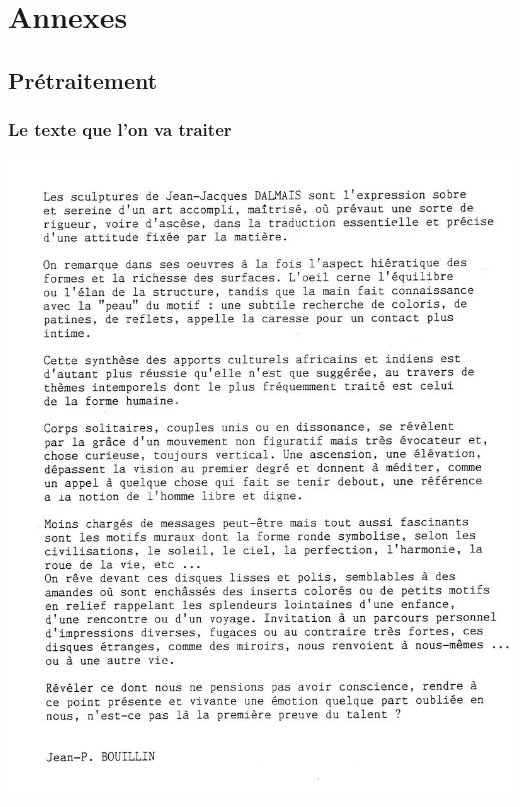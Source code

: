 \documentclass[a4paper,12pt]{report}
\begin{document}








\appendix

\chapter{Annexes} %
\label{cha:annexes}



\section{Pr\'etraitement} %
\label{sec:pr'etraitement}

\subsection{Le texte que l'on va traiter}
\begin{center}
\includegraphics[width=160mm]{texte2.jpg}\\
\caption{ }
\end{center}
\end{document}
